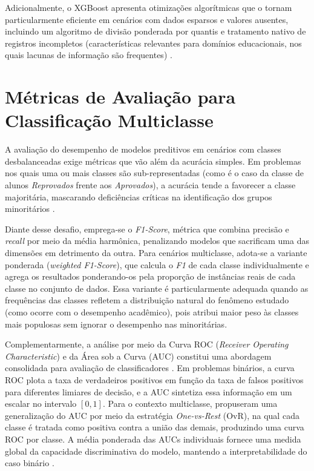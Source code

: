 Adicionalmente, o XGBoost apresenta otimizações algorítmicas que o tornam particularmente eficiente em cenários com dados esparsos e valores ausentes, incluindo um algoritmo de divisão ponderada por quantis e tratamento nativo de registros incompletos (características relevantes para domínios educacionais, nos quais lacunas de informação são frequentes) \cite{chen2016}.

\section{Métricas de Avaliação para Classificação Multiclasse}

A avaliação do desempenho de modelos preditivos em cenários com classes desbalanceadas exige métricas que vão além da acurácia simples. Em problemas nos quais uma ou mais classes são sub-representadas (como é o caso da classe de alunos \textit{Reprovados} frente aos \textit{Aprovados}), a acurácia tende a favorecer a classe majoritária, mascarando deficiências críticas na identificação dos grupos minoritários \cite{he2009}.

Diante desse desafio, emprega-se o \textit{F1-Score}, métrica que combina precisão e \textit{recall} por meio da média harmônica, penalizando modelos que sacrificam uma das dimensões em detrimento da outra. Para cenários multiclasse, adota-se a variante ponderada (\textit{weighted F1-Score}), que calcula o \textit{F1} de cada classe individualmente e agrega os resultados ponderando-os pela proporção de instâncias reais de cada classe no conjunto de dados. Essa variante é particularmente adequada quando as frequências das classes refletem a distribuição natural do fenômeno estudado (como ocorre com o desempenho acadêmico), pois atribui maior peso às classes mais populosas sem ignorar o desempenho nas minoritárias.

Complementarmente, a análise por meio da Curva ROC (\textit{Receiver Operating Characteristic}) e da Área sob a Curva (AUC) constitui uma abordagem consolidada para avaliação de classificadores \cite{fawcett2006}. Em problemas binários, a curva ROC plota a taxa de verdadeiros positivos em função da taxa de falsos positivos para diferentes limiares de decisão, e a AUC sintetiza essa informação em um escalar no intervalo $[0, 1]$. Para o contexto multiclasse,  propuseram uma generalização do AUC por meio da estratégia \textit{One-vs-Rest} (OvR), na qual cada classe é tratada como positiva contra a união das demais, produzindo uma curva ROC por classe. A média ponderada das AUCs individuais fornece uma medida global da capacidade discriminativa do modelo, mantendo a interpretabilidade do caso binário \cite{hand2001}.

